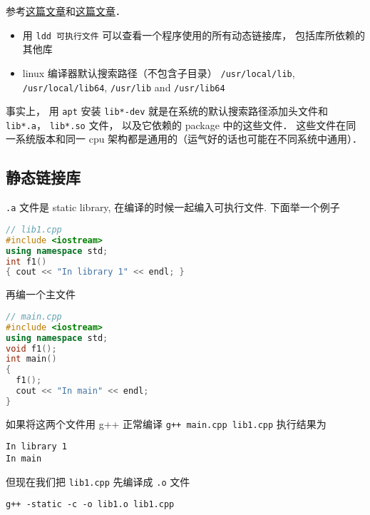 
\begin{issues}
\issueDraft
\end{issues}


参考\href{https://blog.feabhas.com/2014/04/static-and-dynamic-libraries-on-linux/}{这篇文章}和\href{https://gcc.gnu.org/onlinedocs/gcc/Link-Options.html}{这篇文章}．

\begin{itemize}
\item 用 \verb`ldd 可执行文件` 可以查看一个程序使用的所有动态链接库， 包括库所依赖的其他库
\item linux 编译器默认搜索路径（不包含子目录） \verb`/usr/local/lib`, \verb`/usr/local/lib64`, \verb`/usr/lib` and \verb`/usr/lib64`
\end{itemize}

事实上， 用 \verb|apt| 安装 \verb|lib*-dev| 就是在系统的默认搜索路径添加头文件和 \verb|lib*.a|， \verb|lib*.so| 文件， 以及它依赖的 package 中的这些文件． 这些文件在同一系统版本和同一 cpu 架构都是通用的（运气好的话也可能在不同系统中通用）．

\subsection{静态链接库}

\verb|.a| 文件是 static library, 在编译的时候一起编入可执行文件. 下面举一个例子

\begin{lstlisting}[language=cpp]
// lib1.cpp
#include <iostream>
using namespace std;
int f1()
{ cout << "In library 1" << endl; }
\end{lstlisting}

再编一个主文件

\begin{lstlisting}[language=cpp]
// main.cpp
#include <iostream>
using namespace std;
void f1();
int main()
{
  f1();
  cout << "In main" << endl;
}
\end{lstlisting}

如果将这两个文件用 g++ 正常编译 \verb`g++ main.cpp lib1.cpp` 执行结果为
\begin{lstlisting}[language=none]
In library 1
In main
\end{lstlisting}
但现在我们把 \verb|lib1.cpp| 先编译成 \verb|.o| 文件

\begin{lstlisting}[language=none]
g++ -static -c -o lib1.o lib1.cpp
\end{lstlisting}

